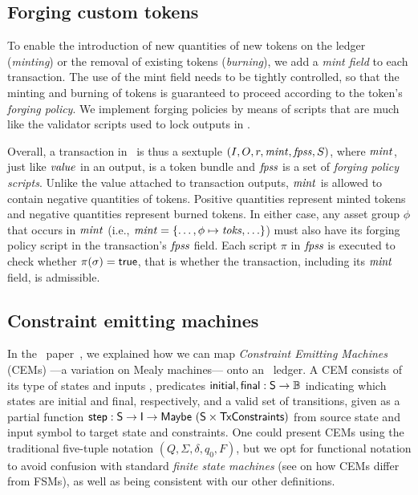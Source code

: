 \subsection{Forging custom tokens}

To enable the introduction of new quantities of new tokens on the ledger (\emph{minting}) or the removal of existing tokens (\emph{burning}), we add a \emph{mint field} to each transaction.
The use of the mint field needs to be tightly controlled, so that the minting and burning of tokens is guaranteed to proceed according to the token's \emph{forging policy}.
We implement forging policies by means of scripts that are much like the validator scripts used to lock outputs in \EUTXO.

Overall, a transaction in \EUTXOma\ is thus a sextuple \((I, O, r, \mathit{mint}, \mathit{fpss}, S)\), where $\mathit{mint}$, just like $\mathit{value}$ in an output, is a token bundle and $\mathit{fpss}$ is a set of \emph{forging policy scripts}.
Unlike the value attached to transaction outputs, $\mathit{mint}$ is allowed to contain negative quantities of tokens. Positive quantities represent minted tokens and negative quantities represent burned tokens.
In either case, any asset group $\phi$ that occurs in $\mathit{mint}$ (i.e., \(\mathit{mint} = \{\ldots, \phi \mapsto \mathit{toks}, \ldots\}\)) must also have its forging policy script in the transaction's $\mathit{fpss}$ field.
Each script $\pi$ in $\mathit{fpss}$ is executed to check whether $\pi(\sigma) = \mathsf{true}$, that is whether the transaction, including its $\mathit{mint}$ field, is admissible.

\subsection{Constraint emitting machines}
\label{sec:cem-example}
In the \EUTXO\ paper~\cite{eutxo-1-paper}, we explained how we can map \emph{Constraint Emitting Machines} (CEMs) ---a variation on Mealy machines--- onto an \EUTXO\ ledger. A CEM consists of its type of states  and inputs
, predicates $\textsf{initial}, \textsf{final} : \textsf{S} \rightarrow \mathbb{B}$
indicating which states are initial and final, respectively, and a valid set of transitions,
given as a partial function $\textsf{step} : \textsf{S} \rightarrow \textsf{I} \rightarrow
\textsf{Maybe}\ (\textsf{S} \times \textsf{TxConstraints})$ from source state and input symbol to
target state and constraints.
%
One could present CEMs using the traditional five-tuple notation $(Q, \Sigma, \delta, q_0, F)$,
but we opt for functional notation to avoid confusion with standard \textit{finite state machines}
(see \cite{eutxo-1-paper} on how CEMs differ from FSMs),
as well as being consistent with our other definitions.

